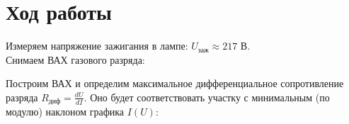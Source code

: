 \documentclass[a4paper, 12pt]{article}
\begin{document}
        \section*{Ход работы}
        Измеряем напряжение зажигания в лампе: $U_{\text{заж}} \approx 217 $ В.\\
        Снимаем ВАХ газового разряда:

        Построим ВАХ и определим максимальное дифференциальное сопротивление разряда $R_{\text{диф}} = \frac{dU}{dI}$. Оно будет соответствовать участку с минимальным (по модулю) наклоном графика $I(U)$:




\end{document}
